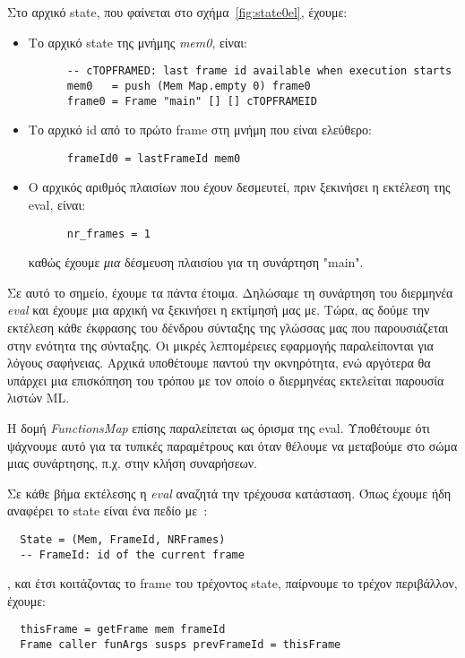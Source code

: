 \documentclass[diploma]{softlab-thesis}
\begin{document}
Στο αρχικό state, που φαίνεται στο σχήμα~\ref{fig:state0el}, έχουμε:
\begin{itemize}
  \item Το αρχικό state της μνήμης \textit{mem0}, είναι:
    \begin{verbatim}
      -- cTOPFRAMED: last frame id available when execution starts
      mem0   = push (Mem Map.empty 0) frame0 
      frame0 = Frame "main" [] [] cTOPFRAMEID 
    \end{verbatim}
  \item Το αρχικό id από το πρώτο frame στη μνήμη που είναι ελεύθερο:
    \begin{verbatim}
      frameId0 = lastFrameId mem0
    \end{verbatim}
  \item Ο αρχικός αριθμός πλαισίων που έχουν δεσμευτεί, πριν ξεκινήσει η εκτέλεση της eval, είναι:
    \begin{verbatim}
      nr_frames = 1
    \end{verbatim}
  καθώς έχουμε \textit{μια} δέσμευση πλαισίου για τη συνάρτηση "main".
\end{itemize}

Σε αυτό το σημείο, έχουμε τα πάντα έτοιμα. Δηλώσαμε τη συνάρτηση του διερμηνέα \textit{eval} και έχουμε μια αρχική
να ξεκινήσει η εκτίμησή μας με. Τώρα, ας δούμε την εκτέλεση κάθε έκφρασης του δένδρου σύνταξης της γλώσσας μας
που παρουσιάζεται στην ενότητα της σύνταξης. Οι μικρές λεπτομέρειες εφαρμογής παραλείπονται για λόγους σαφήνειας. Αρχικά υποθέτουμε παντού την οκνηρότητα,
ενώ αργότερα θα υπάρχει μια επισκόπηση του τρόπου με τον οποίο ο διερμηνέας εκτελείται παρουσία λιστών ML.

Η δομή \textit{FunctionsMap} επίσης παραλείπεται ως όρισμα της eval. Υποθέτουμε ότι ψάχνουμε αυτό για τα τυπικές παραμέτρους και όταν θέλουμε να μεταβούμε στο σώμα μιας συνάρτησης, π.χ. στην 
κλήση συναρήσεων.

Σε κάθε βήμα εκτέλεσης η \textit{eval} αναζητά την τρέχουσα κατάσταση. Όπως έχουμε ήδη αναφέρει το state είναι
ένα πεδίο με~\cite{Abel13}:

\begin{verbatim}
  State = (Mem, FrameId, NRFrames) 
  -- FrameId: id of the current frame
\end{verbatim}
, και έτσι κοιτάζοντας το frame του τρέχοντος state, παίρνουμε το τρέχον περιβάλλον, έχουμε:
\begin{verbatim}
  thisFrame = getFrame mem frameId 
  Frame caller funArgs susps prevFrameId = thisFrame 
\end{verbatim}
\end{document}
